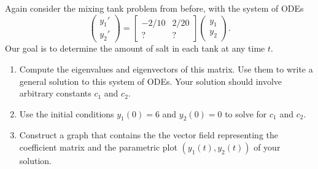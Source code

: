 \begin{problem}
 Again consider the mixing tank problem from before, with the system of ODEs
$$
\begin{pmatrix}
 y_1'\\y_2'
\end{pmatrix}
=
\begin{bmatrix}
 -2/10 & 2/20\\
 ? & ?
\end{bmatrix}
\begin{pmatrix}
 y_1\\y_2
\end{pmatrix}.
$$
Our goal is to determine the amount of salt in each tank at any time $t$. 
\begin{enumerate}
 \item Compute the eigenvalues and eigenvectors of this matrix.  Use them to write a general solution to this system of ODEs. Your solution should involve arbitrary constants $c_1$ and $c_2$.
 \item Use the initial conditions $y_1(0)=6$ and $y_2(0)=0$ to solve for $c_1$ and $c_2$.
 \item {}%
Construct a graph that contains the the vector field representing the coefficient matrix and the parametric plot $(y_1(t),y_2(t))$ of your solution.
\end{enumerate}

\end{problem}


